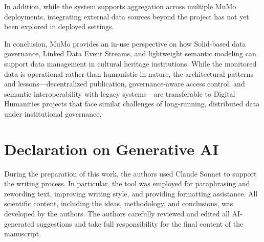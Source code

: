 In addition, while the system supports aggregation across multiple MuMo
deployments, integrating external data sources beyond the project has
not yet been explored in deployed settings.

In conclusion, MuMo provides an in-use perspective on how Solid-based
data governance, Linked Data Event Streams, and lightweight semantic
modeling can support data management in cultural heritage institutions.
While the monitored data is operational rather than humanistic in
nature, the architectural patterns and lessons---decentralized
publication, governance-aware access control, and semantic
interoperability with legacy systems---are transferable to Digital
Humanities projects that face similar challenges of long-running,
distributed data under institutional governance.

\section*{Declaration on Generative AI}

During the preparation of this work, the authors used Claude Sonnet to
support the writing process. In particular, the tool was employed for
paraphrasing and rewording text, improving writing style, and providing
formatting assistance. All scientific content, including the ideas,
methodology, and conclusions, was developed by the authors. The authors
carefully reviewed and edited all AI-generated suggestions and take full
responsibility for the final content of the manuscript.
